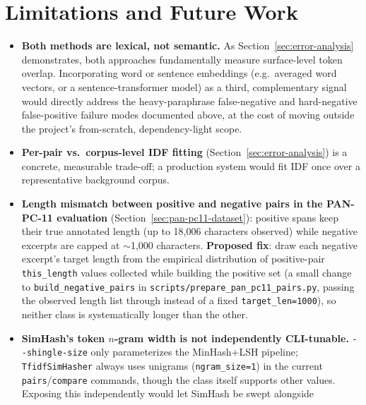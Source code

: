 \documentclass[11pt]{article}
\begin{document}
\section{Limitations and Future Work}
\label{sec:limitations}

\begin{itemize}
    \item \textbf{Both methods are lexical, not semantic.} As Section~\ref{sec:error-analysis}
          demonstrates, both approaches fundamentally measure surface-level token overlap. Incorporating
          word or sentence embeddings (e.g.\ averaged word vectors, or a sentence-transformer model) as a
          third, complementary signal would directly address the heavy-paraphrase false-negative and
          hard-negative false-positive failure modes documented above, at the cost of moving outside the
          project's from-scratch, dependency-light scope.
    \item \textbf{Per-pair vs.\ corpus-level IDF fitting} (Section~\ref{sec:error-analysis}) is a concrete,
          measurable trade-off; a production system would fit IDF once over a representative background
          corpus.
    \item \textbf{Length mismatch between positive and negative pairs in the PAN-PC-11 evaluation}
          (Section~\ref{sec:pan-pc11-dataset}): positive spans keep their true annotated length (up to
          18{,}006 characters observed) while negative excerpts are capped at $\sim$1{,}000 characters.
          \textbf{Proposed fix}: draw each negative excerpt's target length from the empirical distribution
          of positive-pair \verb|this_length| values collected while building the positive set (a small
          change to \verb|build_negative_pairs| in \verb|scripts/prepare_pan_pc11_pairs.py|, passing the
          observed length list through instead of a fixed \verb|target_len=1000|), so neither class is
          systematically longer than the other.
    \item \textbf{SimHash's token $n$-gram width is not independently CLI-tunable.} \verb|--shingle-size|
          only parameterizes the MinHash+LSH pipeline; \verb|TfidfSimHasher| always uses unigrams
          (\verb|ngram_size=1|) in the current \texttt{pairs}/\texttt{compare} commands, though the class
          itself supports other values. Exposing this independently would let SimHash be swept alongside

\end{itemize}
\end{document}
